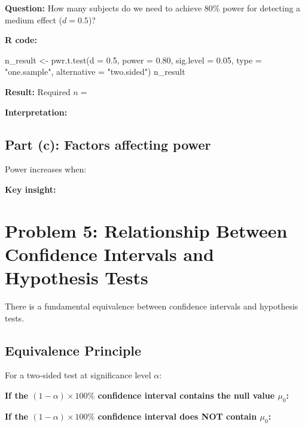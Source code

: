 \documentclass[11pt]{article}
\begin{document}
\textbf{Question:} How many subjects do we need to achieve 80\% power for detecting a medium effect ($d = 0.5$)?

\textbf{R code:}
\begin{rcode}
n_result <- pwr.t.test(d = 0.5,
                        power = 0.80,
                        sig.level = 0.05,
                        type = "one.sample",
                        alternative = "two.sided")
n_result
\end{rcode}

\textbf{Result:} Required $n = $

\vspace{1cm}

\textbf{Interpretation:}

\vspace{2cm}

\subsection*{Part (c): Factors affecting power}

Power increases when:

\vspace{4cm}

\textbf{Key insight:}

\vspace{2cm}

\pagebreak

\section*{Problem 5: Relationship Between Confidence Intervals and Hypothesis Tests}

There is a fundamental equivalence between confidence intervals and hypothesis tests.

\subsection*{Equivalence Principle}

For a two-sided test at significance level $\alpha$:

\textbf{If the $(1-\alpha) \times 100\%$ confidence interval contains the null value $\mu_0$:}

\vspace{2cm}

\textbf{If the $(1-\alpha) \times 100\%$ confidence interval does NOT contain $\mu_0$:}

\vspace{2cm}
\end{document}
